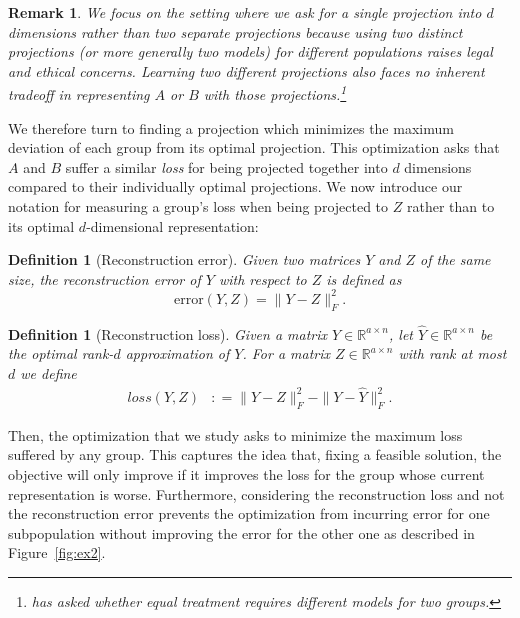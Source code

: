 \documentclass{article}
\newtheorem{definition}[theorem]{Definition} \newtheorem{claim}[theorem]{Claim}
\newtheorem{remark}[theorem]{Remark}
\begin{document}
\begin{remark}
  We focus on the setting where we ask for a single projection into
  $d$ dimensions rather than two separate projections because using
  two distinct projections (or more generally two models) for
  different populations raises legal and ethical concerns. Learning
  two different projections also faces no inherent tradeoff in
  representing $A$ or $B$ with those projections.\footnote{\citet{lipton}  
    has asked whether equal treatment requires different models for
    two groups.}
  \end{remark}

  We therefore turn to finding a projection which minimizes the
  maximum deviation of each group from its optimal projection. This
  optimization asks that $A$ and $B$ suffer a similar \emph{loss} for
  being projected together into $d$ dimensions compared to their
  individually optimal projections. We now introduce our notation for
  measuring a group's loss when being projected to $Z$ rather than to its
  optimal $d$-dimensional representation:

  \begin{definition}[Reconstruction error] Given two matrices $Y$ and
    $Z$ of the same size, the reconstruction error of $Y$ with
    respect to $Z$ is defined as
$$\text{error}(Y, Z) = \|Y - Z\|_F^2.$$
\end{definition}


\begin{definition}[Reconstruction loss] Given a matrix $Y\in \mathbb{R}^{a\times n}$, let
  $\widehat{Y}\in \mathbb{R}^{a \times n}$ be the optimal rank-$d$ approximation of $Y$. For
  a matrix $Z\in \mathbb{R}^{a\times n}$ with rank at most $d$
we define
        \begin{align*}
        loss(Y,Z) & : = \|Y -Z\|_F^2 - \|Y - \widehat{Y}\|_F^2.
        \end{align*}
      \end{definition}

      Then, the optimization that we study asks to minimize the maximum
      loss suffered by any group. This captures the idea that,
      fixing a feasible solution, the objective will only improve if
      it improves the loss for the group whose current representation
      is worse. Furthermore, considering the reconstruction loss and not the reconstruction error prevents the optimization from incurring error for one subpopulation without improving the error for the other one as described in Figure~\ref{fig:ex2}.
\end{document}
